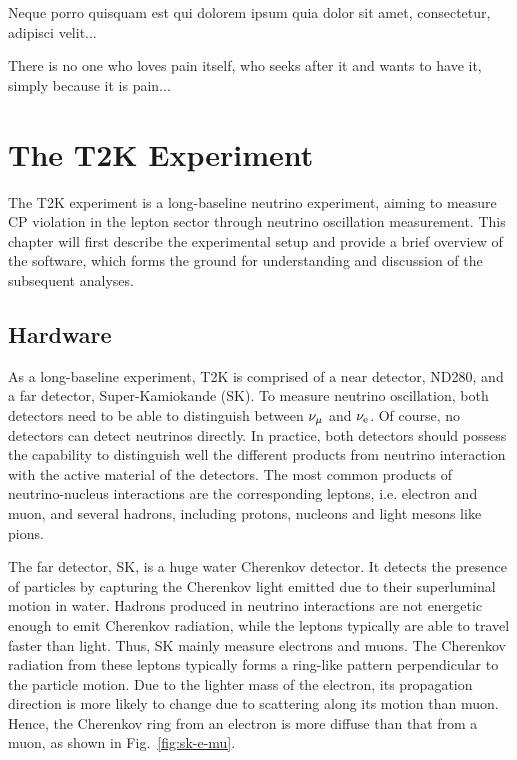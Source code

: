 \begin{savequote}[8cm]
\textlatin{Neque porro quisquam est qui dolorem ipsum quia dolor sit amet, consectetur, adipisci velit...}

There is no one who loves pain itself, who seeks after it and wants to have it, simply because it is pain...
\end{savequote}

\chapter{\label{ch:3-t2k}The T2K Experiment} 

\minitoc
The T2K experiment is a long-baseline neutrino experiment, aiming to measure CP violation in the lepton sector through neutrino oscillation measurement.
This chapter will first describe the experimental setup and provide a brief overview of the software, which forms the ground for understanding and discussion of the subsequent analyses.


\section{Hardware}
As a long-baseline experiment, T2K is comprised of a near detector, ND280, and a far detector, Super-Kamiokande (SK).
To measure neutrino oscillation, both detectors need to be able to distinguish between $\nu_{\mu}$ and $\nu_{\textrm{e}}$.  
Of course, no detectors can detect neutrinos directly.
In practice, both detectors should possess the capability to distinguish well the different products from neutrino interaction with the active material of the detectors.
The most common products of neutrino-nucleus interactions are the corresponding leptons, i.e. electron and muon, and several hadrons, including protons, nucleons and light mesons like pions.

The far detector, SK, is a huge water Cherenkov detector.
It detects the presence of particles by capturing the Cherenkov light emitted due to their superluminal motion in water.
Hadrons produced in neutrino interactions are not energetic enough to emit Cherenkov radiation, while the leptons typically are able to travel faster than light.
Thus, SK mainly measure electrons and muons.
The Cherenkov radiation from these leptons typically forms a ring-like pattern perpendicular to the particle motion.
Due to the lighter mass of the electron, its propagation direction is more likely to change due to scattering along its motion than muon.
Hence, the Cherenkov ring from an electron is more diffuse than that from a muon, as shown in Fig.~\ref{fig:sk-e-mu}.

